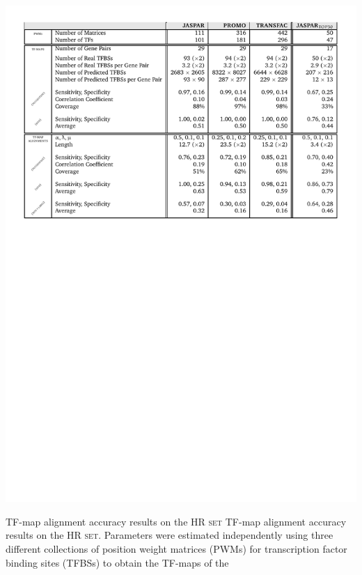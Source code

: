 \begin{landscape}
\begin{table}[t!]
\begin{center}
\begin{minipage}{0.98\linewidth}\setlength{\parindent}{0pt}
\begin{center}
\includegraphics[bb=30 479 566 817,clip]{tables/maccuracy}
\end{center}
\end{minipage}
          {TF-map alignment accuracy results on the \textsc{HR set}}%
          {TF-map alignment accuracy results on the \textsc{HR set}.}%
          {\tiny Parameters were estimated independently using three
           different collections of  position weight matrices (PWMs) for
           transcription factor binding sites (TFBSs) to obtain the TF-maps of the
}
\end{center}
\end{table}
\end{landscape}
